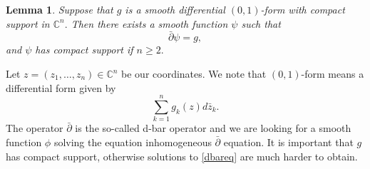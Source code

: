 \documentclass[12pt]{article}
\theoremstyle{theorem}
\newtheorem*{lemma}{Lemma}
\theoremstyle{definition}
\theoremstyle{remark}
\begin{document}
\begin{lemma} \label{lemma1}
Suppose that $g$ is a smooth differential $(0,1)$-form with compact support
in ${\mathbb C}^n .$  Then there exists a smooth function $\psi$ such that
\begin{equation} \label{dbareq}
\bar{\partial} \psi = g ,
\end{equation}
and $\psi$ has compact support if $n \geq 2.$
\end{lemma}

Let $z = (z_1,\ldots,z_n) \in {\mathbb C}^n$ be our coordinates.
We note that $(0,1)$-form means a differential form given by
\begin{equation*}
\sum_{k=1}^n g_k(z) d \bar{z}_k .
\end{equation*}
The operator $\bar{\partial}$ is the
so-called
d-bar operator and we are looking for a smooth function $\phi$ solving the
equation inhomogeneous $\bar{\partial}$ equation.
It is important that $g$ has compact support, otherwise solutions
to \eqref{dbareq} are much harder to obtain.
\end{document}
